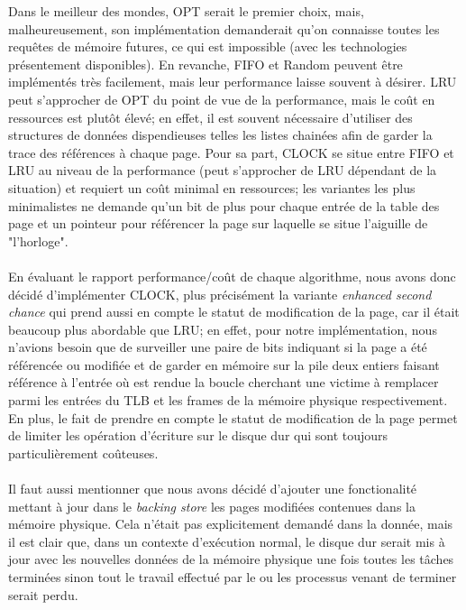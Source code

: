 \documentclass{article}
\begin{document}
Dans le meilleur des mondes, OPT serait le premier choix, mais, malheureusement, son implémentation demanderait qu'on connaisse toutes les 
requêtes de mémoire futures, ce qui est impossible (avec les technologies présentement disponibles). En revanche, FIFO et Random peuvent être 
implémentés très facilement, mais leur performance laisse souvent à désirer. LRU peut s'approcher de OPT du point de vue de la performance, mais 
le coût en ressources est plutôt élevé; en effet, il est souvent nécessaire d'utiliser des structures de données dispendieuses telles les listes 
chainées afin de garder la trace des références à chaque page. Pour sa part, CLOCK se situe entre FIFO et LRU au niveau de la performance (peut 
s'approcher de LRU dépendant de la situation) et requiert un coût minimal en ressources; les variantes les plus minimalistes ne demande qu'un 
bit de plus pour chaque entrée de la table des page et un pointeur pour référencer la page sur laquelle se situe l'aiguille de "l'horloge".\\
\\
En évaluant le rapport performance/coût de chaque algorithme, nous avons donc décidé d'implémenter CLOCK, plus précisément la variante 
\emph{enhanced second chance} qui prend aussi en compte le statut de modification de la page, car il était beaucoup plus abordable que LRU; en 
effet, pour notre implémentation, nous n'avions besoin que de surveiller une paire de bits indiquant si la page a été référencée ou modifiée et 
de garder en mémoire sur la pile deux entiers faisant référence à l'entrée où est rendue la boucle cherchant une victime à remplacer parmi les 
entrées du TLB et les frames de la mémoire physique respectivement. En plus, le fait de prendre en compte le statut de modification de la page 
permet de limiter les opération d'écriture sur le disque dur qui sont toujours particulièrement coûteuses.\\ 
\\
Il faut aussi mentionner que nous avons décidé d'ajouter une fonctionalité mettant à jour dans le \emph{backing store} les pages modifiées 
contenues dans la mémoire physique. Cela n'était pas explicitement demandé dans la donnée, mais il est clair que, dans un contexte d'exécution 
normal, le disque dur serait mis à jour avec les nouvelles données de la mémoire physique une fois toutes les tâches terminées sinon tout le 
travail effectué par le ou les processus venant de terminer serait perdu.\\
\\
\end{document}
